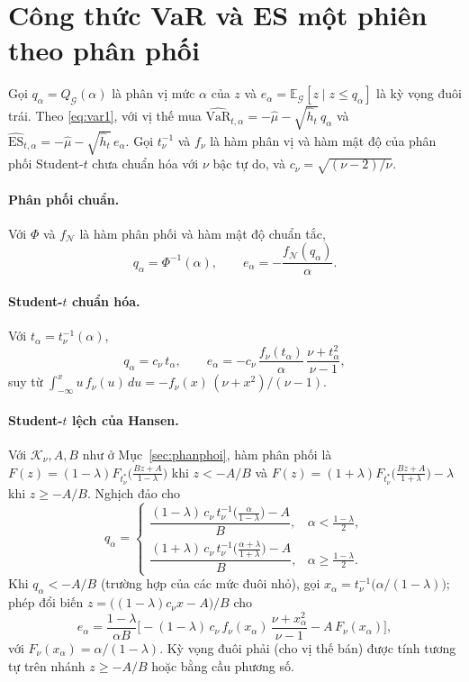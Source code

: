 \documentclass[12pt,a4paper]{article}
\theoremstyle{definition}
\theoremstyle{remark}
\newcommand{\E}{\mathbb{E}}
\newcommand{\VaR}{\mathrm{VaR}}
\newcommand{\ES}{\mathrm{ES}}
\newcommand{\Gcal}{\mathcal{G}}
\begin{document}
\appendix
\section{Công thức VaR và ES một phiên theo phân phối}\label{app:varES}

Gọi $q_\alpha=Q_{\Gcal}(\alpha)$ là phân vị mức $\alpha$ của $z$ và $e_\alpha=\E_{\Gcal}[z\mid z\le q_\alpha]$ là kỳ vọng đuôi trái. Theo \eqref{eq:var1}, với vị thế mua $\widehat{\VaR}_{t,\alpha}=-\hat\mu-\sqrt{\hat h_t}\,q_\alpha$ và $\widehat{\ES}_{t,\alpha}=-\hat\mu-\sqrt{\hat h_t}\,e_\alpha$. Gọi $t_\nu^{-1}$ và $f_\nu$ là hàm phân vị và hàm mật độ của phân phối Student-$t$ chưa chuẩn hóa với $\nu$ bậc tự do, và $c_\nu=\sqrt{(\nu-2)/\nu}$.

\paragraph{Phân phối chuẩn.} Với $\Phi$ và $f_{\mathcal N}$ là hàm phân phối và hàm mật độ chuẩn tắc,
\begin{equation}
q_\alpha=\Phi^{-1}(\alpha),\qquad e_\alpha=-\frac{f_{\mathcal N}(q_\alpha)}{\alpha}.
\end{equation}

\paragraph{Student-$t$ chuẩn hóa.} Với $t_\alpha=t_\nu^{-1}(\alpha)$,
\begin{equation}
q_\alpha=c_\nu\,t_\alpha,\qquad e_\alpha=-c_\nu\,\frac{f_\nu(t_\alpha)}{\alpha}\,\frac{\nu+t_\alpha^2}{\nu-1},
\end{equation}
suy từ $\int_{-\infty}^{x}u\,f_\nu(u)\,du=-f_\nu(x)\,(\nu+x^2)/(\nu-1)$.

\paragraph{Student-$t$ lệch của Hansen.} Với $\mathcal K_\nu,A,B$ như ở Mục~\ref{sec:phanphoi}, hàm phân phối là $F(z)=(1-\lambda)F_{t^*_\nu}\big(\tfrac{Bz+A}{1-\lambda}\big)$ khi $z<-A/B$ và $F(z)=(1+\lambda)F_{t^*_\nu}\big(\tfrac{Bz+A}{1+\lambda}\big)-\lambda$ khi $z\ge-A/B$. Nghịch đảo cho
\begin{equation}
q_\alpha=
\begin{cases}
\dfrac{(1-\lambda)\,c_\nu\,t_\nu^{-1}\!\big(\frac{\alpha}{1-\lambda}\big)-A}{B}, & \alpha<\frac{1-\lambda}{2},\\[12pt]
\dfrac{(1+\lambda)\,c_\nu\,t_\nu^{-1}\!\big(\frac{\alpha+\lambda}{1+\lambda}\big)-A}{B}, & \alpha\ge\frac{1-\lambda}{2}.
\end{cases}
\end{equation}
Khi $q_\alpha<-A/B$ (trường hợp của các mức đuôi nhỏ), gọi $x_\alpha=t_\nu^{-1}\big(\alpha/(1-\lambda)\big)$; phép đổi biến $z=\big((1-\lambda)c_\nu x-A\big)/B$ cho
\begin{equation}
e_\alpha=\frac{1-\lambda}{\alpha B}\Big[-(1-\lambda)\,c_\nu\,f_\nu(x_\alpha)\,\frac{\nu+x_\alpha^2}{\nu-1}-A\,F_\nu(x_\alpha)\Big],
\end{equation}
với $F_\nu(x_\alpha)=\alpha/(1-\lambda)$. Kỳ vọng đuôi phải (cho vị thế bán) được tính tương tự trên nhánh $z\ge-A/B$ hoặc bằng cầu phương số.
\end{document}
